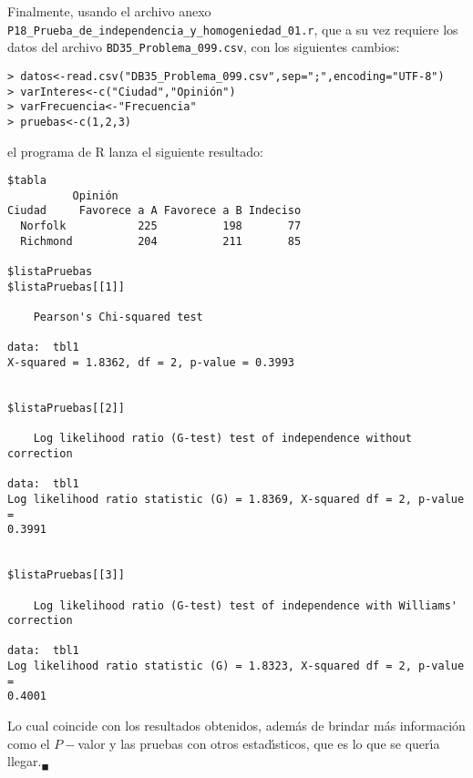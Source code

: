 \begin{solucion}
 Finalmente, usando el archivo anexo
 \texttt{P18\_Prueba\_de\_independencia\_y\_homogeniedad\_01.r},
 que a su vez requiere los datos del archivo
 \texttt{BD35\_Problema\_099.csv}, con los siguientes cambios:
 \begin{verbatim}
> datos<-read.csv("DB35_Problema_099.csv",sep=";",encoding="UTF-8")
> varInteres<-c("Ciudad","Opinión")
> varFrecuencia<-"Frecuencia"
> pruebas<-c(1,2,3)
 \end{verbatim}
 \vspace{-0.5cm}
 el programa de R lanza el siguiente resultado:
 \begin{verbatim}
$tabla
          Opinión
Ciudad     Favorece a A Favorece a B Indeciso
  Norfolk           225          198       77
  Richmond          204          211       85

$listaPruebas
$listaPruebas[[1]]

	Pearson's Chi-squared test

data:  tbl1
X-squared = 1.8362, df = 2, p-value = 0.3993


$listaPruebas[[2]]

	Log likelihood ratio (G-test) test of independence without correction

data:  tbl1
Log likelihood ratio statistic (G) = 1.8369, X-squared df = 2, p-value =
0.3991


$listaPruebas[[3]]

	Log likelihood ratio (G-test) test of independence with Williams' correction

data:  tbl1
Log likelihood ratio statistic (G) = 1.8323, X-squared df = 2, p-value =
0.4001
 \end{verbatim}
 \vspace{-0.5cm}
 Lo cual coincide con los resultados obtenidos,
 adem\'as de brindar m\'as informaci\'on como el $P-$valor
 y las pruebas con otros estad\'{\i}sticos,
 que es lo que se quer\'{\i}a llegar.${}_{\blacksquare}$
\end{solucion}
